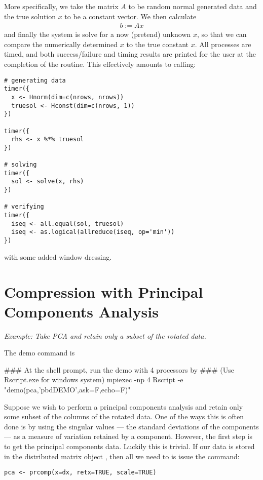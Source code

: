 More specifically, we take the matrix $A$ to be random normal generated data and the true solution $x$ to be a constant vector.  We then calculate
\begin{align*}
b := Ax
\end{align*}
and finally the system is solve for a now (pretend) unknown $x$, so that we can compare the numerically determined $x$ to the true constant $x$.  All processes are timed, and both success/failure and timing results are printed for the user at the completion of the routine.  This effectively amounts to calling:
\begin{lstlisting}[language=rr,title=Verifying Distributed System Solving]
# generating data
timer({
  x <- Hnorm(dim=c(nrows, nrows))
  truesol <- Hconst(dim=c(nrows, 1))
})

timer({
  rhs <- x %*% truesol
})

# solving
timer({
  sol <- solve(x, rhs)
})

# verifying
timer({
  iseq <- all.equal(sol, truesol)
  iseq <- as.logical(allreduce(iseq, op='min'))
})
\end{lstlisting}
with some added window dressing.







\section{Compression with Principal Components Analysis}

\emph{Example:  Take PCA and retain only a subset of the rotated data.}

The demo command is
\begin{Command}
### At the shell prompt, run the demo with 4 processors by
### (Use Rscript.exe for windows system)
mpiexec -np 4 Rscript -e "demo(pca,'pbdDEMO',ask=F,echo=F)"
\end{Command}

Suppose we wish to perform a principal components analysis and retain only some subset of the columns of the rotated data.  One of the ways this is often done is by using the singular values --- the standard deviations of the components --- as a measure of variation retained by a component.  However, the first step is to get the principal components data.  Luckily this is trivial.  If our data is stored in the distributed matrix object , then all we need to is issue the command:
\begin{lstlisting}[language=rr]
pca <- prcomp(x=dx, retx=TRUE, scale=TRUE)
\end{lstlisting}

